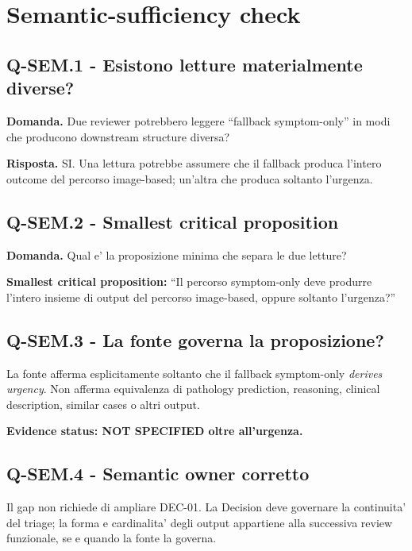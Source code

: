 \documentclass[11pt,a4paper]{article}
\begin{document}
\section{Semantic-sufficiency check}

\subsection{Q-SEM.1 - Esistono letture materialmente diverse?}
\begin{ddtacheck}
\textbf{Domanda.} Due reviewer potrebbero leggere ``fallback symptom-only'' in modi che producono downstream structure diversa?
\end{ddtacheck}

\textbf{Risposta.} SI. Una lettura potrebbe assumere che il fallback produca l'intero outcome del percorso image-based; un'altra che produca soltanto l'urgenza.

\subsection{Q-SEM.2 - Smallest critical proposition}
\begin{ddtacheck}
\textbf{Domanda.} Qual e' la proposizione minima che separa le due letture?
\end{ddtacheck}

\textbf{Smallest critical proposition:} ``Il percorso symptom-only deve produrre l'intero insieme di output del percorso image-based, oppure soltanto l'urgenza?''

\subsection{Q-SEM.3 - La fonte governa la proposizione?}
La fonte afferma esplicitamente soltanto che il fallback symptom-only \emph{derives urgency}. Non afferma equivalenza di pathology prediction, reasoning, clinical description, similar cases o altri output.

\textbf{Evidence status: NOT SPECIFIED oltre all'urgenza.}

\subsection{Q-SEM.4 - Semantic owner corretto}
Il gap non richiede di ampliare DEC-01. La Decision deve governare la continuita' del triage; la forma e cardinalita' degli output appartiene alla successiva review funzionale, se e quando la fonte la governa.
\end{document}
